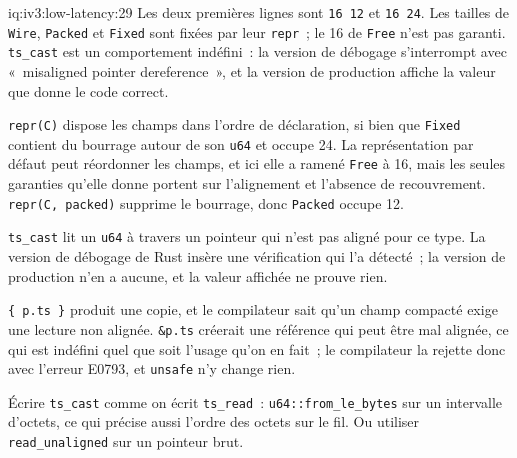 \begin{solution}{iq:iv3:low-latency:29}
Les deux premières lignes sont \texttt{16 12} et \texttt{16 24}. Les tailles de \texttt{Wire}, \texttt{Packed} et \texttt{Fixed} sont fixées par leur \texttt{repr}~; le 16 de \texttt{Free} n'est pas garanti. \texttt{ts\_cast} est un comportement indéfini~: la version de débogage s'interrompt avec «~misaligned pointer dereference~», et la version de production affiche la valeur que donne le code correct.

\texttt{repr(C)} dispose les champs dans l'ordre de déclaration, si bien que \texttt{Fixed} contient du bourrage autour de son \texttt{u64} et occupe 24. La représentation par défaut peut réordonner les champs, et ici elle a ramené \texttt{Free} à 16, mais les seules garanties qu'elle donne portent sur l'alignement et l'absence de recouvrement. \texttt{repr(C, packed)} supprime le bourrage, donc \texttt{Packed} occupe 12.

\texttt{ts\_cast} lit un \texttt{u64} à travers un pointeur qui n'est pas aligné pour ce type. La version de débogage de Rust insère une vérification qui l'a détecté~; la version de production n'en a aucune, et la valeur affichée ne prouve rien.

\texttt{\{ p.ts \}} produit une copie, et le compilateur sait qu'un champ compacté exige une lecture non alignée. \texttt{\&p.ts} créerait une référence qui peut être mal alignée, ce qui est indéfini quel que soit l'usage qu'on en fait~; le compilateur la rejette donc avec l'erreur E0793, et \texttt{unsafe} n'y change rien.

Écrire \texttt{ts\_cast} comme on écrit \texttt{ts\_read}~: \texttt{u64::from\_le\_bytes} sur un intervalle d'octets, ce qui précise aussi l'ordre des octets sur le fil. Ou utiliser \texttt{read\_unaligned} sur un pointeur brut.

\end{solution}

